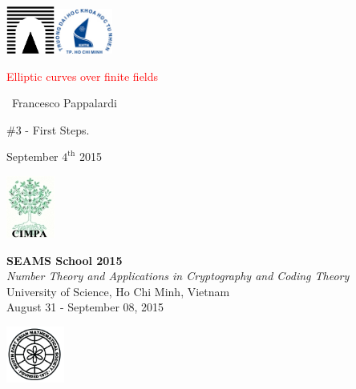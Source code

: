 \documentclass[10pt,handout]{beamer} %
\title[Elliptic curves over $\F_{q}$]{\insertlecture}
\theoremstyle{definition}
\begin{document}
\begin{frame}
\includegraphics[width=1.6cm]{images/roma3.pdf}\hfill\includegraphics[width=1.9cm]{images/HCMCUS.jpeg}
\vfill

\begin{center}\begin{sc}
\begin{Large}

\textcolor{red}{Elliptic curves over finite fields}
\end{Large}\bigskip

\ {Francesco Pappalardi}\bigskip\bigskip

\begin{large}\begin{bf}\#3 - First Steps.
\end{bf}\end{large}\medskip

September $4^{\text{th}}$ 2015\medskip
\vfill
\end{sc}\end{center}

\includegraphics[width=1.6cm]{images/cimpalogo.pdf}\hfill
\begin{minipage}[b]{9.3cm}
\textbf{SEAMS School 2015}\\
\textit{Number Theory and Applications in Cryptography and Coding Theory}\\
University of Science, Ho Chi Minh, Vietnam\\
August 31 - September 08, 2015
\end{minipage}\hfill
\includegraphics[width=1.9cm]{images/seams.png}
\end{frame}
\end{document}
